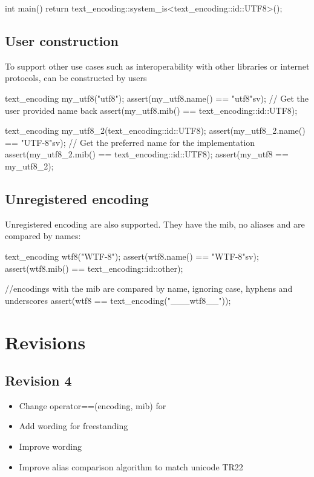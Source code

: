 \documentclass{wg21}
\begin{document}
\begin{colorblock}
int main() {
    return text_encoding::system_is<text_encoding::id::UTF8>();
}
\end{colorblock}




\subsection{User construction}

To support other use cases such as interoperability with other libraries or internet protocols,
 can be constructed by users

\begin{colorblock}
text_encoding my_utf8("utf8");
assert(my_utf8.name() == "utf8"sv); // Get the user provided name back
assert(my_utf8.mib() == text_encoding::id::UTF8);

text_encoding my_utf8_2(text_encoding::id::UTF8);
assert(my_utf8_2.name() == "UTF-8"sv); // Get the preferred name for the implementation
assert(my_utf8_2.mib() == text_encoding::id::UTF8);
assert(my_utf8 == my_utf8_2);
\end{colorblock}

\subsection{Unregistered encoding}

Unregistered encoding are also supported. They have the  mib, no aliases and are compared
by names:

\begin{colorblock}
text_encoding wtf8("WTF-8");
assert(wtf8.name() == "WTF-8"sv);
assert(wtf8.mib() == text_encoding::id::other);

//encodings with the  mib are compared by name, ignoring case, hyphens and underscores
assert(wtf8 == text_encoding("___wtf8__"));
\end{colorblock}


\section{Revisions}

\subsection*{Revision 4}
\begin{itemize}
    \item Change operator==(encoding, mib) for 
    \item Add wording for freestanding
    \item Improve wording
    \item Improve alias comparison algorithm to match unicode TR22
\end{itemize}
\end{document}

